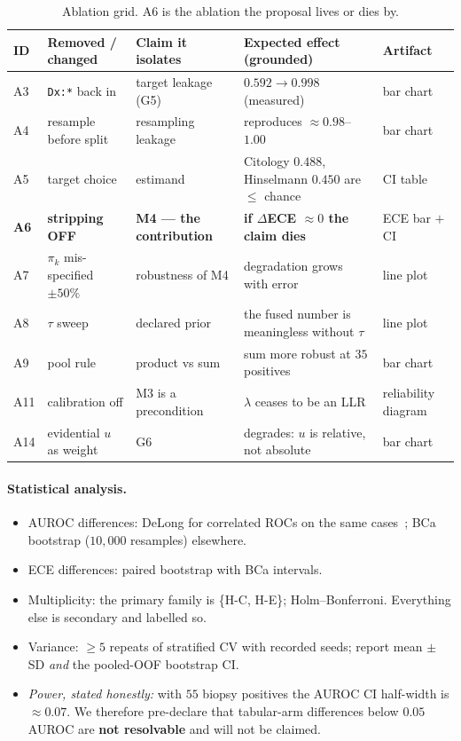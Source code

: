 \documentclass[sigplan,nonacm,screen]{acmart}
\begin{document}
\begin{table}[t]
\caption{Ablation grid. A6 is the ablation the proposal lives or dies by.}
\label{tab:abl}
\footnotesize
\setlength{\tabcolsep}{4pt}
\begin{tabular}{@{}llp{3.4cm}p{3.4cm}p{2.6cm}@{}}
\toprule
\textbf{ID} & \textbf{Removed / changed} & \textbf{Claim it isolates} & \textbf{Expected effect (grounded)} & \textbf{Artifact} \\
\midrule
A3 & \texttt{Dx:*} back in & target leakage (G5) & $0.592 \!\to\! 0.998$ (measured) & bar chart \\
A4 & resample before split & resampling leakage & reproduces $\approx0.98$--$1.00$~\cite{roy2025interpretable} & bar chart \\
A5 & target choice & estimand & Citology $0.488$, Hinselmann $0.450$ are $\le$ chance & CI table \\
\textbf{A6} & \textbf{stripping OFF} & \textbf{M4 --- the contribution} & \textbf{if $\Delta$ECE $\approx0$ the claim dies} & ECE bar $+$ CI \\
A7 & $\pi_k$ mis-specified $\pm50\%$ & robustness of M4 & degradation grows with error & line plot \\
A8 & $\tau$ sweep & declared prior & the fused number is meaningless without $\tau$ & line plot \\
A9 & pool rule & product vs sum & sum more robust at $35$ positives~\cite{kittler1998combining} & bar chart \\
A11 & calibration off & M3 is a precondition & $\lambda$ ceases to be an LLR & reliability diagram \\
A14 & evidential $u$ as weight & G6 & degrades: $u$ is relative, not absolute & bar chart \\
\bottomrule
\end{tabular}
\end{table}

\paragraph{Statistical analysis.}
\begin{itemize}
  \item AUROC differences: DeLong for correlated ROCs on the same cases~\cite{delong1988comparing}; BCa bootstrap ($10{,}000$ resamples) elsewhere.
  \item ECE differences: paired bootstrap with BCa intervals.
  \item Multiplicity: the primary family is \{H-C, H-E\}; Holm--Bonferroni. Everything else is secondary and labelled so.
  \item Variance: $\ge5$ repeats of stratified CV with recorded seeds; report mean $\pm$ SD \emph{and} the pooled-OOF bootstrap CI.
  \item \emph{Power, stated honestly:} with $55$ biopsy positives the AUROC CI half-width is $\approx0.07$. We therefore pre-declare that tabular-arm differences below $0.05$ AUROC are \textbf{not resolvable} and will not be claimed.
\end{itemize}
\end{document}
